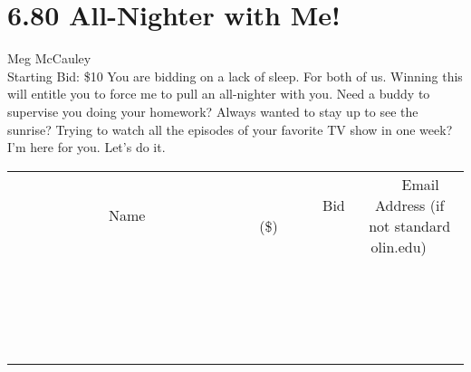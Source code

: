 \documentclass[11pt]{article}
\begin{document}
\section*{6.80 All-Nighter with Me!}
Meg McCauley
\\
Starting Bid: \$10
\newline
You are bidding on a lack of sleep. For both of us. Winning this will entitle you to force me to pull an all-nighter with you. Need a buddy to supervise you doing your homework? Always wanted to stay up to see the sunrise? Trying to watch all the episodes of your favorite TV show in one week? I'm here for you. Let's do it.
\\[3ex]
\begin{tabular}{c c c}
~~~~~~~~~~~~~Name~~~~~~~~~~~~~ & ~~~~~~~~~Bid (\$)~~~~~~~~~  & ~~~Email Address (if not standard olin.edu)~~~\\
 & & \\
\hline
 & & \\
\hline
 & & \\
\hline
 & & \\
\hline
 & & \\
\hline
 & & \\
\hline
 & & \\
\hline
 & & \\
\hline
 & & \\
\hline
 & & \\
\hline
 & & \\
\hline
 & & \\
\hline
 & & \\
\hline
 & & \\
\hline
 & & \\
\hline
 & & \\
\hline
 & & \\
\hline
 & & \\
\hline
 & & \\
\hline
\end{tabular}
\newpage
\end{document}
